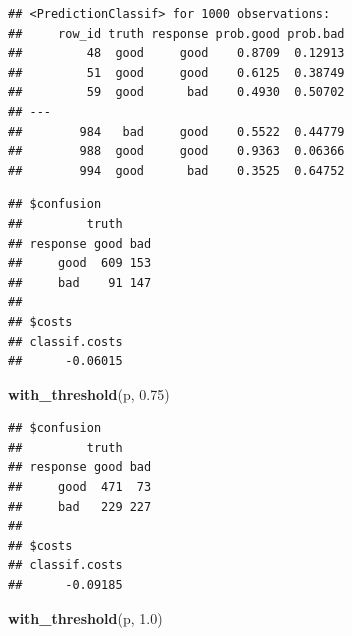 \documentclass[]{scrbook}
\newenvironment{Shaded}{\begin{snugshade}}{\end{snugshade}}
\newcommand{\CommentTok}[1]{\textcolor[rgb]{0.56,0.35,0.01}{\textit{#1}}}
\newcommand{\ControlFlowTok}[1]{\textcolor[rgb]{0.13,0.29,0.53}{\textbf{#1}}}
\newcommand{\DataTypeTok}[1]{\textcolor[rgb]{0.13,0.29,0.53}{#1}}
\newcommand{\FloatTok}[1]{\textcolor[rgb]{0.00,0.00,0.81}{#1}}
\newcommand{\KeywordTok}[1]{\textcolor[rgb]{0.13,0.29,0.53}{\textbf{#1}}}
\newcommand{\NormalTok}[1]{#1}
\newcommand{\OperatorTok}[1]{\textcolor[rgb]{0.81,0.36,0.00}{\textbf{#1}}}
\newcommand{\StringTok}[1]{\textcolor[rgb]{0.31,0.60,0.02}{#1}}
\renewenvironment{Shaded} {\begin{snugshade}\small} {\end{snugshade}}
\begin{document}
\begin{verbatim}
## <PredictionClassif> for 1000 observations:
##     row_id truth response prob.good prob.bad
##         48  good     good    0.8709  0.12913
##         51  good     good    0.6125  0.38749
##         59  good      bad    0.4930  0.50702
## ---                                         
##        984   bad     good    0.5522  0.44779
##        988  good     good    0.9363  0.06366
##        994  good      bad    0.3525  0.64752
\end{verbatim}

\begin{Shaded}
\end{Shaded}

\begin{verbatim}
## $confusion
##         truth
## response good bad
##     good  609 153
##     bad    91 147
## 
## $costs
## classif.costs 
##      -0.06015
\end{verbatim}

\begin{Shaded}
\begin{Highlighting}[]
\KeywordTok{with_threshold}\NormalTok{(p, }\FloatTok{0.75}\NormalTok{)}
\end{Highlighting}
\end{Shaded}

\begin{verbatim}
## $confusion
##         truth
## response good bad
##     good  471  73
##     bad   229 227
## 
## $costs
## classif.costs 
##      -0.09185
\end{verbatim}

\begin{Shaded}
\begin{Highlighting}[]
\KeywordTok{with_threshold}\NormalTok{(p, }\FloatTok{1.0}\NormalTok{)}
\end{Highlighting}
\end{Shaded}
\end{document}
